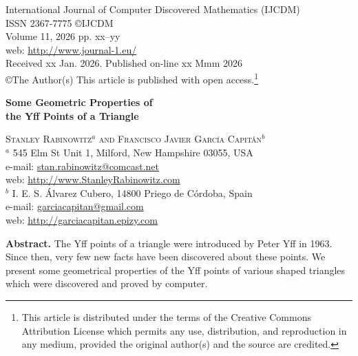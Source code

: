 \documentclass[12pt,a4paper]{amsart}
\begin{document}
International Journal of  Computer Discovered Mathematics (IJCDM) \\
ISSN 2367-7775 \copyright IJCDM \\
Volume 11, 2026 pp. xx--yy  \\
web: \url{http://www.journal-1.eu/} \\
Received xx Jan. 2026. Published on-line xx Mmm 2026\\ 

\copyright The Author(s) This article is published 
with open access.\footnote{This article is distributed under the terms of the Creative Commons Attribution License which permits any use, distribution, and reproduction in any medium, provided the original author(s) and the source are credited.} \\
\bigskip
\bigskip

\begin{center}
	{\Large \textbf{Some Geometric Properties of}} \\
	{\Large \textbf{the Yff Points of a Triangle}} \\
	\medskip
	\bigskip
        \bigskip

	\textsc{Stanley Rabinowitz$^a$ and Francisco Javier Garc\'{\i}a Capit\'an$^b$} \\

	$^a$ 545 Elm St Unit 1,  Milford, New Hampshire 03055, USA \\
	e-mail: \href{mailto:stan.rabinowitz@comcast.net}{stan.rabinowitz@comcast.net}%
	\\web: \url{http://www.StanleyRabinowitz.com} \\
	
	$^b$ I. E. S. \'Alvarez Cubero, 14800 Priego de C\'ordoba, Spain \\
	e-mail: \href{mailto:garciacapitan@gmail.com}{garciacapitan@gmail.com} \\
	web: \url{http://garciacapitan.epizy.com} \\

\bigskip
\bigskip

\end{center}
\bigskip

\textbf{Abstract.}
The Yff points of a triangle were introduced by Peter Yff in 1963.
Since then, very few new facts have been discovered about these points.
We present some geometrical properties of the Yff points of various
shaped triangles which were discovered and proved by computer.
\end{document}
